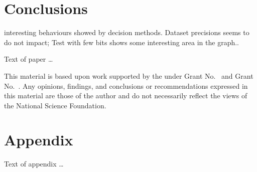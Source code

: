 \documentclass[sigplan,review,anonymous=false]{acmart}\settopmatter{printfolios=true,printccs=false,printacmref=false}
\begin{document}
\section{Conclusions}
interesting behaviours showed by decision methods. Dataset precisions seems to do not impact;
Test with few bits shows some interesting area in the graph..

Text of paper \ldots


\begin{acks}                            %
  This material is based upon work supported by the
   under Grant
  No.~ and Grant
  No.~.  Any opinions, findings, and
  conclusions or recommendations expressed in this material are those
  of the author and do not necessarily reflect the views of the
  National Science Foundation.
\end{acks}





\appendix
\section{Appendix}

Text of appendix \ldots
\end{document}
